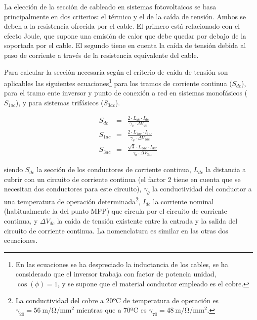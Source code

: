 La elección de la sección de cableado en sistemas fotovoltaicos se
basa principalmente en dos criterios: el térmico y el de la caída de
tensión. Ambos se deben a la resistencia ofrecida por el cable.  El
primero está relacionado con el efecto Joule, que supone una emisión
de calor que debe quedar por debajo de la soportada por el cable.  El
segundo tiene en cuenta la caída de tensión debida al paso de
corriente a través de la resistencia equivalente del cable.

Para calcular la sección necesaria según el criterio de caída de
tensión son aplicables las siguientes ecuaciones\footnote{En las ecuaciones se ha despreciado la inductancia de los
  cables, se ha considerado que el inversor trabaja con factor de
  potencia unidad,
  $\cos(\phi)=1$, y se supone que el material
  conductor empleado es el cobre. %
} para los tramos de
corriente continua ($S_{dc}$), para el tramo ente
inversor y punto de conexión a red en sistemas monofásicos ($S_{1ac}$), y para sistemas trifásicos ($S_{3ac}$).

\[
  \begin{aligned}
    S_{dc} & = & \frac{2 \cdot L_{dc}\cdot I_{dc}}{\gamma_\theta \cdot \Delta V_{dc}}\\
    S_{1ac} & = & \frac{2\cdot L_{1ac}\cdot I_{1ac}}{\gamma_\theta \cdot \Delta V_{1ac}}\\
    S_{3ac} & = & \frac{\sqrt{3} \cdot L_{3ac}\cdot I_{3ac}}{\gamma_\theta \cdot \Delta V_{3ac}}
  \end{aligned}
\]

siendo $S_{dc}$ la sección de los conductores de corriente continua,
$L_{dc}$ la distancia a cubrir con un circuito de corriente continua
(el factor 2 tiene en cuenta que se necesitan dos conductores para
este circuito), $\gamma_\theta$ la conductividad del conductor a una temperatura
de operación determinada\footnote{La conductividad del cobre a 20ºC de
  temperatura de operación es $\gamma_{20} =\SI{56}{\meter\per\ohm\per\milli\meter\squared}$ mientras que a 70ºC es
$\gamma_{70} = \SI{48}{\meter\per\ohm\per\milli\meter\squared}$.},
$I_{dc}$ la corriente nominal (habitualmente la del punto MPP) que
circula por el circuito de corriente continua, y $\Delta V_{dc}$ la
caída de tensión existente entre la entrada y la salida del circuito
de corriente continua. La nomenclatura es similar en las otras dos
ecuaciones.

